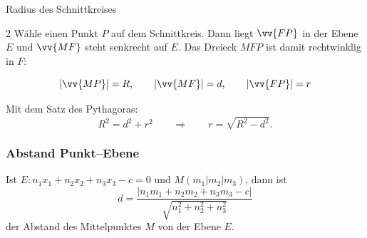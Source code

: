\begin{b8d}{Radius des Schnittkreises}{}
\begin{multicols}{2}
Wähle einen Punkt \(P\) auf dem Schnittkreis. Dann liegt \(\vv{FP}\) in der Ebene \(E\) und
\(\vv{MF}\) steht senkrecht auf \(E\). Das Dreieck \(MFP\) ist damit rechtwinklig in \(F\):

\[
\left|\vv{MP}\right|=R ,\qquad \left|\vv{MF}\right|=d,\qquad \left|\vv{FP}\right|=r
\]

Mit dem Satz des Pythagoras:
\[
R^2 = d^2 + r^2
\qquad\Rightarrow\qquad
r=\sqrt{R^2-d^2}.
\]


\subsubsection*{Abstand Punkt–Ebene }
Ist \(E: n_1x_1+n_2x_2+n_3x_3 -c =0\) und \(M(m_1|m_2|m_3)\), dann ist
\[
d=\frac{|n_1m_1+n_2m_2+n_3m_3 -c|}{\sqrt{n_1^2 +n_2^2 + n_3^2}}
\]
der Abstand des Mittelpunktes \(M\) von der Ebene \(E\). 
\bigskip
\end{multicols}
\begin{center}
\end{center}
\end{b8d}
